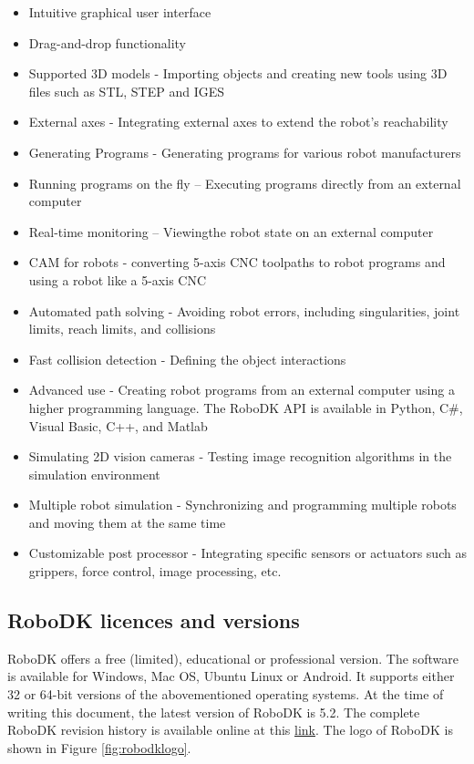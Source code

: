 \begin{itemize}
\item Intuitive graphical user interface
\item Drag-and-drop functionality 
\item Supported 3D models - Importing objects and creating new tools using 3D files such as STL, STEP and IGES
\item External axes - Integrating external axes to extend the robot’s reachability
\item Generating Programs - Generating programs for various robot manufacturers
\item Running programs on the fly – Executing programs directly from an external computer
\item Real-time monitoring – Viewingthe robot state on an external computer 
\item CAM for robots - converting 5-axis CNC toolpaths to robot programs and using a robot like a 5-axis CNC
\item Automated path solving - Avoiding robot errors, including singularities, joint limits, reach limits, and collisions
\item Fast collision detection - Defining the object interactions 
\item Advanced use - Creating robot programs from an external computer using a higher programming language. The RoboDK API is available in Python, C#, Visual Basic, C++, and Matlab
\item Simulating 2D vision cameras - Testing image recognition algorithms in the simulation environment
\item Multiple robot simulation - Synchronizing and programming multiple robots and moving them at the same time 
\item Customizable post processor - Integrating specific sensors or actuators such as grippers, force control, image processing, etc.
\end{itemize}

\subsection{RoboDK licences and versions}

RoboDK offers a free (limited), educational or professional version. 
The software is available for Windows, Mac OS, Ubuntu Linux or Android. It supports either 32 or 64-bit versions of the abovementioned operating systems. At the time of writing this document, the latest version of RoboDK is 5.2. The complete RoboDK revision history is available online at this \href{https://en.etsmtl.ca/unites-de-recherche/coro/accueil?lang=en-CA}{link}. The logo of RoboDK is shown in Figure \ref{fig:robodklogo}.

